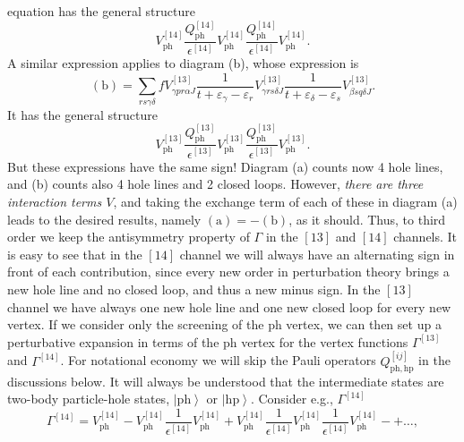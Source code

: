 equation has the general structure
\[
            V_{\mathrm{ph}}^{[14]}
            \frac{Q_{\mathrm{ph}}^{[14]}}{\epsilon^{[14]}}
             V_{\mathrm{ph}}^{[14]}
            \frac{Q_{\mathrm{ph}}^{[14]}}{\epsilon^{[14]}}
            V_{\mathrm{ph}}^{[14]}.
\]
A similar expression applies to diagram (b), whose expression
is
\begin{equation}
      \mathrm{(b)}=\sum_{rs\gamma\delta}f
      V^{[13]}_{\gamma pr\alpha J}
      \frac{1}{t+\varepsilon_{\gamma}
        -\varepsilon_{r} } V^{[13]}_{\gamma rs\delta J}
      \frac{1}{t+\varepsilon_{\delta}
               -\varepsilon_{s} } V^{[13]}_{\beta s q\delta J}.
       \label{Morten:eq:thirdphb}
\end{equation}
It has the general structure
\[
            V_{\mathrm{ph}}^{[13]}
            \frac{Q_{\mathrm{ph}}^{[13]}}{\epsilon^{[13]}}
             V_{\mathrm{ph}}^{[13]}
            \frac{Q_{\mathrm{ph}}^{[13]}}{\epsilon^{[13]}}
            V_{\mathrm{ph}}^{[13]}.
\]
But these expressions have the same sign! Diagram (a) counts
now 4 hole lines, and (b) counts also 4 hole lines and 2 closed
loops. However, {\em there are three interaction terms $V$}, 
and taking
the exchange term of each of these in diagram (a) leads to
the desired results, namely $\mathrm{(a)}=-\mathrm{(b)}$, as it should.
Thus, to third order we keep the antisymmetry property of 
$\Gamma$ in the $[13]$ and $[14]$ channels.
It is easy to see that in the $[14]$ channel we will always
have an alternating sign in front of each contribution, 
since every new order in perturbation theory brings a new hole
line and no closed loop, and thus a new minus sign.
In the $[13]$ channel we have always one new hole line and
one new closed loop for every new vertex. 
If we consider only the screening of the ph vertex, we can then set up
a perturbative expansion in terms of the ph vertex for the 
vertex functions $\Gamma^{[13]}$ and $\Gamma^{[14]}$. 
For notational economy we will skip the Pauli operators
$Q_{\mathrm{ph,hp}}^{[ij]}$ in the discussions below.
It will always be understood that the intermediate states
are two-body particle-hole states, $\left| \mathrm{ph}\right\rangle$ or
$\left| \mathrm{hp}\right\rangle$. 
Consider e.g.,
$\Gamma^{[14]}$ 
\begin{equation}
       \Gamma^{[14]}=V^{[14]}_{\mathrm{ph}}-
        V^{[14]}_{\mathrm{ph}}
        \frac{1}{\epsilon^{[14]}}
        V_{\mathrm{ph}}^{[14]}+
        V^{[14]}_{\mathrm{ph}}
        \frac{1}{\epsilon^{[14]}}
        V^{[14]}_{\mathrm{ph}}
        \frac{1}{\epsilon^{[14]}}
        V^{[14]}_{\mathrm{ph}}-+\dots,
\end{equation}
